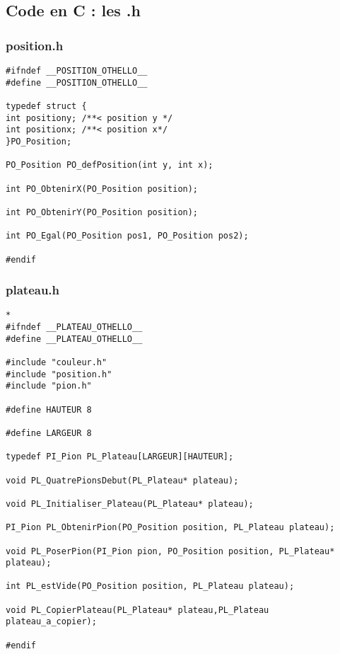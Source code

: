 \subsection{Code en C : les .h}
\subsubsection{position.h}
\begin{lstlisting}
#ifndef __POSITION_OTHELLO__
#define __POSITION_OTHELLO__

typedef struct {
int positiony; /**< position y */
int positionx; /**< position x*/
}PO_Position;

PO_Position PO_defPosition(int y, int x);

int PO_ObtenirX(PO_Position position);

int PO_ObtenirY(PO_Position position);

int PO_Egal(PO_Position pos1, PO_Position pos2);

#endif

\end{lstlisting}

\subsubsection{plateau.h}
\begin{lstlisting}*
#ifndef __PLATEAU_OTHELLO__
#define __PLATEAU_OTHELLO__

#include "couleur.h"
#include "position.h"
#include "pion.h"

#define HAUTEUR 8

#define LARGEUR 8

typedef PI_Pion PL_Plateau[LARGEUR][HAUTEUR];  

void PL_QuatrePionsDebut(PL_Plateau* plateau);

void PL_Initialiser_Plateau(PL_Plateau* plateau);

PI_Pion PL_ObtenirPion(PO_Position position, PL_Plateau plateau);

void PL_PoserPion(PI_Pion pion, PO_Position position, PL_Plateau* plateau);

int PL_estVide(PO_Position position, PL_Plateau plateau);

void PL_CopierPlateau(PL_Plateau* plateau,PL_Plateau plateau_a_copier);

#endif
\end{lstlisting}
